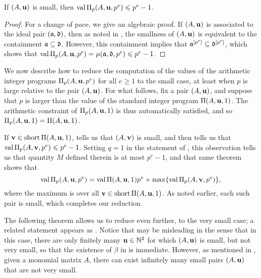 \documentclass[11pt]{amsart}
\newcommand{\short}{\operatorname{short}}
\begin{document}
\begin{proposition}
   \label{trivial small value bound: P} 
   If $(A, \mathbf{u})$ is small,  then $\operatorname{val} \Pi_p(A, \mathbf{u}, p^e) \leqslant p^e-1$.
\end{proposition}

\begin{proof}
   For a change of pace, we give an algebraic proof.
   If $(A,\mathbf{u})$ is associated to the ideal pair $(\mathfrak{a}, \mathfrak{d})$, then as noted in , the smallness of $(A, \mathbf{u})$ is equivalent to the containment $\mathfrak{a} \subseteq \mathfrak{d}$.
   However, this containment implies that $\mathfrak{a}^{[p^e]} \subseteq \mathfrak{d}^{[p^e]}$, which shows that $\operatorname{val} \Pi_p(A, \mathbf{u}, p^e) = \mu(\mathfrak{a}, \mathfrak{d}, p^e) \leqslant p^e-1$.
\end{proof}

\begin{remark}
   We now describe how to reduce the computation of the values of the arithmetic integer programs $\Pi_p(A, \mathbf{u}, p^e)$ for all $e \geq 1$ to the small case, at least when $p$ is large relative to the pair $(A, \mathbf{u})$. 
   For what follows, fix a pair $(A, \mathbf{u})$, and suppose that $p$ is larger than the value of the standard integer program $\Pi(A, \mathbf{u},1)$.
   The arithmetic constraint of $\Pi_p(A,\mathbf{u},1)$ is thus automatically satisfied, and so $\Pi_p(A, \mathbf{u}, 1) = \Pi(A, \mathbf{u}, 1)$.

   If $\vv{v} \in \short \IP(A,\vv{u},1)$,  tells us that $(A, \mathbf{v})$ is small, and   then tells us that $\operatorname{val} \Pi_p(A, \mathbf{v}, p^e) \leqslant p^e-1$.
   Setting $q=1$ in the statement of , this observation tells us that quantity $M$ defined therein is at most $p^e-1$, and that same theorem shows that
   \[ \operatorname{val} \Pi_p(A, \mathbf{u},p^e) = \operatorname{val} \Pi(A, \mathbf{u},1)p^e + \max \{ \operatorname{val} \Pi_p(A, \mathbf{v}, p^e) \},\]
   where the maximum is over all $\vv{v} \in \short \IP(A, \vv{u},1)$.
   As noted earlier, each such pair is small, which completes our reduction.
\end{remark}

The following theorem allows us to reduce even further, to the very small case; a related statement appears as \cite[Theorem~6.4]{hernandez+etal.frobenius_powers}. 
Notice that  may be misleading in the sense that in this case, there are only finitely many $\mathbf{u} \in \mathbb{N}^2$ for which $(A, \mathbf{u})$ is small, but not very small, so that the existence of $\beta$ in  is immediate. 
However, as mentioned in , given a monomial matrix $A$, there can exist infinitely many small pairs $(A, \mathbf{u})$ that are not very small.
\end{document}
